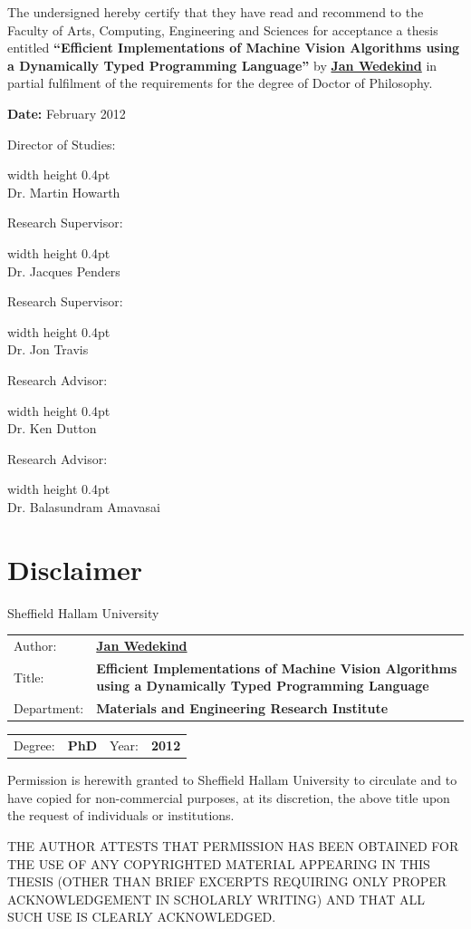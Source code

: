 \documentclass[12pt,a4paper,oneside,openright]{book}
\newcommand{\xtitle}{Efficient Implementations of Machine Vision Algorithms using a Dynamically Typed Programming Language}
\newcommand{\theyear}{2012}
\newcommand{\thedate}{February \theyear}
\newcommand{\shu}{Sheffield Hallam University}
\newcommand{\meri}{Materials and Engineering Research Institute}
\newcommand{\theauthor}{\href{http://www.wedesoft.de/}{Jan Wedekind}}
\newcommand{\dos}{Dr. Martin Howarth}
\newcommand{\supervisorone}{Dr. Jacques Penders}
\newcommand{\supervisortwo}{Dr. Jon Travis}
\newcommand{\supervisorthree}{Dr. Ken Dutton}
\newcommand{\supervisorfour}{Dr. Balasundram Amavasai}
\newcommand{\signature}[2]{\begin{minipage}[b]{.4\textwidth}
    #1:
  \end{minipage}
  \begin{minipage}[t]{.58\textwidth}
    \begin{center}
      \vspace{2pt}
      \vrule width \textwidth height 0.4pt\\
      \small #2
    \end{center}
  \end{minipage}\vspace{14pt}}
\begin{document}
\begin{CJK}{UTF8}{}
\begin{large}
  The undersigned hereby certify that they have read and recommend to the Faculty of Arts, Computing, Engineering and Sciences for acceptance a thesis entitled \textbf{``\xtitle''} by \textbf{\theauthor} in partial fulfilment of the requirements for the degree of Doctor of Philosophy.\\\medskip
  \begin{flushright}
    \begin{minipage}[c]{.8\textwidth}
      \begin{flushright}
        \textbf{Date:} \thedate
      \end{flushright}\vspace{5ex}
      \signature{Director of Studies}{\dos}\vspace{6ex}
      \signature{Research Supervisor}{\supervisorone}
      \signature{Research Supervisor}{\supervisortwo}
      \signature{Research Advisor}{\supervisorthree}
      \signature{Research Advisor}{\supervisorfour}
    \end{minipage}
  \end{flushright}
\end{large}

\chapter*{Disclaimer}
\begin{center}
  \shu\\\medskip
  \begin{tabular}{lp{}}
    Author: & \textbf{\theauthor}\\
    Title: & \textbf{\xtitle}\\
    Department: & \textbf{\meri}
  \end{tabular}
  \begin{tabular}{lp{}lp{}}
    Degree: & \textbf{PhD} & Year: & \textbf{\theyear}
  \end{tabular}\bigskip

  \begin{flushleft}
    Permission is herewith granted to Sheffield Hallam University to circulate and to have copied for non-commercial purposes, at its discretion, the above title upon the request of individuals or institutions.\bigskip

    THE AUTHOR ATTESTS THAT PERMISSION HAS BEEN OBTAINED FOR THE USE OF ANY COPYRIGHTED MATERIAL APPEARING IN THIS THESIS (OTHER THAN BRIEF EXCERPTS REQUIRING ONLY PROPER ACKNOWLEDGEMENT IN SCHOLARLY WRITING) AND THAT ALL SUCH USE IS CLEARLY ACKNOWLEDGED.
  \end{flushleft}\vspace{6ex}


\end{center}
\end{CJK}
\end{document}
